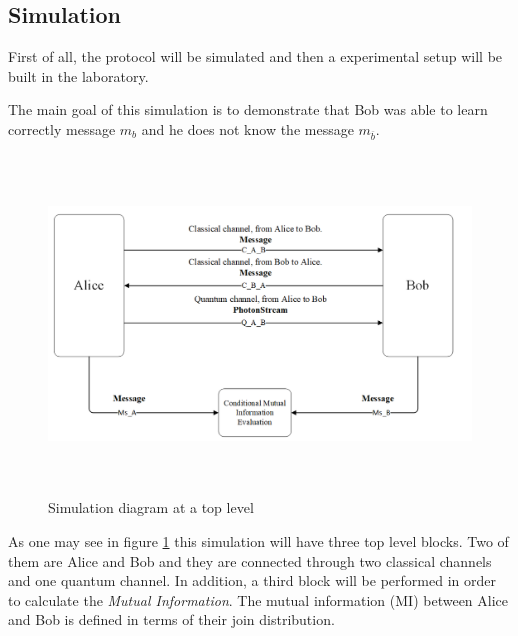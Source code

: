 \subsection{Simulation}

First of all, the protocol will be simulated and then a experimental setup will be built in the laboratory.

The main goal of this simulation is to demonstrate that Bob was able to learn correctly message $m_{b}$ and he does not know the message $m_{\overline{b}}$.

\begin{figure}[H]
	\centering
	\includegraphics[width=1.0\textwidth, height=9cm]{./sdf/ot_with_discrete_variables/figures/Simulation_diagram_top.png}
	\caption{Simulation diagram at a top level}\label{toplevelsimulation}
\end{figure}

As one may see in figure \ref{toplevelsimulation} this simulation will have three top level blocks. Two of them are Alice and Bob and they are connected through two classical channels and one quantum channel. In addition, a third block will be performed in order to calculate the \textit{Mutual Information}. The mutual information (MI) between Alice and Bob is defined in terms of their join distribution.


